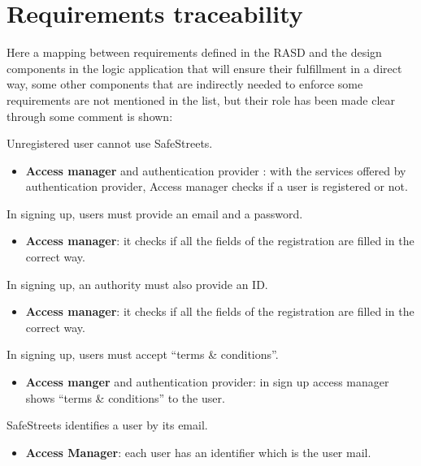 \documentclass[../RASD.tex]{subfiles}
\begin{document}
    \chapter{Requirements traceability}\label{ch:requirements-traceability}
    Here a mapping between requirements defined in the RASD and the design components in the logic application that will ensure their fulfillment in a direct way,
    some other components that are indirectly needed to enforce some requirements are not mentioned in the list,
    but their role has been made clear through some comment is shown:
    \begin{enumerate}
         Unregistered user cannot use SafeStreets.
        \begin{itemize}
            \item \textbf{Access manager} and authentication provider : with the services offered by authentication provider,
            Access manager checks if a user is registered or not.
        \end{itemize}

         In signing up, users must provide an email and a password.
        \begin{itemize}
            \item \textbf{Access manager}: it checks if all the fields of the registration are filled in the correct way.
        \end{itemize}

         In signing up, an authority must also provide an ID.
        \begin{itemize}
            \item \textbf{Access manager}: it checks if all the fields of the registration are filled in the correct way.
        \end{itemize}

         In signing up, users must accept “terms \& conditions”.
        \begin{itemize}
            \item \textbf{Access manger} and authentication provider: in sign up access manager shows “terms \& conditions” to the user.
        \end{itemize}

         SafeStreets identifies a user by its email.
        \begin{itemize}
            \item \textbf{Access Manager}: each user has an identifier which is the user mail.
        \end{itemize}


\end{enumerate}
\end{document}
